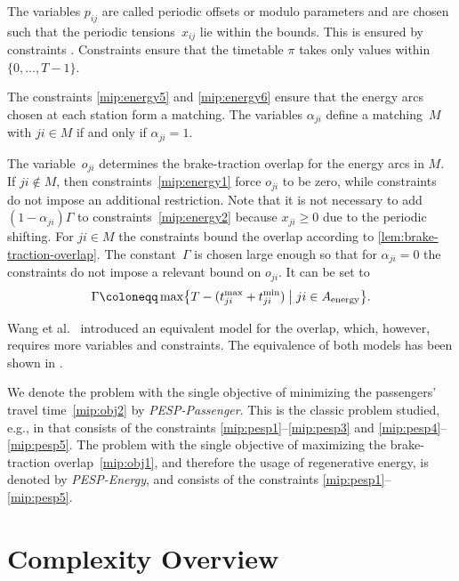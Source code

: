 \documentclass[11pt,a4paper]{article}
\makeatletter
\newcommand{\energy}{\mathrm{energy}}
\newcommand{\energyact}{M}               %
\newcommand{\pesppassenger}{PESP-Passenger\xspace}
\newcommand{\pespenergy}{PESP-Energy\xspace}
\theoremstyle{definition}
\theoremstyle{remark}
\DeclareRobustCommand{\labelcrefrange}[2]{\@crefrangenostar{labelcref}{#1}{#2}}
\makeatother
\begin{document}
The variables $p_{ij}$ are called periodic offsets or modulo parameters and are chosen such that the periodic tensions~$x_{ij}$ lie within the bounds. This is ensured by constraints . Constraints  ensure that the timetable $\pi$ takes only values within $\{0,\dotsc,T-1\}$.

The constraints \eqref{mip:energy5} and \eqref{mip:energy6} ensure that the energy arcs chosen at each station form a matching. The variables $\alpha_{ji}$ define a matching~$\energyact$ with $ji \in \energyact$ if and only if $\alpha_{ji} = 1$.

The variable~$o_{ji}$ determines the brake-traction overlap for the energy arcs in $\energyact$. If $ji \notin \energyact$, then constraints~\eqref{mip:energy1} force $o_{ji}$ to be zero, while constraints~ do not impose an additional restriction. Note that it is not necessary to add $(1-\alpha_{ji}) \Gamma$ to constraints~\eqref{mip:energy2} because $x_{ji} \ge 0$ due to the periodic shifting. For $ji \in \energyact$ the constraints \labelcrefrange{mip:energy2}{mip:energy3} bound the overlap according to \cref{lem:brake-traction-overlap}. The constant~$\Gamma$ is chosen large enough so that for $\alpha_{ji} = 0$ the constraints  do not impose a relevant bound on $o_{ji}$. It can be set to 
\[\Gamma \coloneqq \max\bigl\{T - (t^{\max}_{ji} + t^{\min}_{ji}) \bigm| ji \in A_{\energy}\bigr\}.\]


Wang et al.~\cite{Wang2022a} introduced an equivalent model for the overlap, which, however, requires more variables and constraints. The equivalence of both models has been shown in \cite{atmos}.

We denote the problem with the single objective of minimizing the passengers' travel time~\eqref{mip:obj2} by \emph{\pesppassenger}. This is the classic problem studied, e.g., in \cite{nac1996,Liebchen2006} that consists of the constraints \eqref{mip:pesp1}--\eqref{mip:pesp3} and  \eqref{mip:pesp4}--\eqref{mip:pesp5}. The problem with the single objective of maximizing the brake-traction overlap~\eqref{mip:obj1}, and therefore the usage of regenerative energy, is denoted by \emph{\pespenergy}, and consists of the constraints \eqref{mip:pesp1}--\eqref{mip:pesp5}.




\section{Complexity Overview}
\label{sec-compl-overview}
\end{document}
